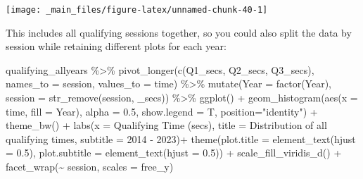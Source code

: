 \documentclass[
]{book}
\newenvironment{Shaded}{\begin{snugshade}}{\end{snugshade}}
\newcommand{\AttributeTok}[1]{\textcolor[rgb]{0.77,0.63,0.00}{#1}}
\newcommand{\FloatTok}[1]{\textcolor[rgb]{0.00,0.00,0.81}{#1}}
\newcommand{\FunctionTok}[1]{\textcolor[rgb]{0.00,0.00,0.00}{#1}}
\newcommand{\NormalTok}[1]{#1}
\newcommand{\SpecialCharTok}[1]{\textcolor[rgb]{0.00,0.00,0.00}{#1}}
\newcommand{\StringTok}[1]{\textcolor[rgb]{0.31,0.60,0.02}{#1}}
\begin{document}
\begin{center}\texttt{[image: \_main\_files/figure-latex/unnamed-chunk-40-1]} \end{center}

This includes all qualifying sessions together, so you could also split the data by session while retaining different plots for each year:

\begin{Shaded}
\begin{Highlighting}[]
\NormalTok{qualifying\_allyears }\SpecialCharTok{\%\textgreater{}\%}
  \FunctionTok{pivot\_longer}\NormalTok{(}\FunctionTok{c}\NormalTok{(}\StringTok{\textquotesingle{}Q1\_secs\textquotesingle{}}\NormalTok{, }\StringTok{\textquotesingle{}Q2\_secs\textquotesingle{}}\NormalTok{, }\StringTok{\textquotesingle{}Q3\_secs\textquotesingle{}}\NormalTok{),}
               \AttributeTok{names\_to =} \StringTok{\textquotesingle{}session\textquotesingle{}}\NormalTok{,}
               \AttributeTok{values\_to =} \StringTok{\textquotesingle{}time\textquotesingle{}}\NormalTok{) }\SpecialCharTok{\%\textgreater{}\%}
  \FunctionTok{mutate}\NormalTok{(}\AttributeTok{Year =} \FunctionTok{factor}\NormalTok{(Year),}
         \AttributeTok{session =} \FunctionTok{str\_remove}\NormalTok{(session, }\StringTok{\textquotesingle{}\_secs\textquotesingle{}}\NormalTok{)) }\SpecialCharTok{\%\textgreater{}\%}
  \FunctionTok{ggplot}\NormalTok{() }\SpecialCharTok{+}
  \FunctionTok{geom\_histogram}\NormalTok{(}\FunctionTok{aes}\NormalTok{(}\AttributeTok{x =}\NormalTok{ time, }\AttributeTok{fill =}\NormalTok{ Year),}
                 \AttributeTok{alpha =} \FloatTok{0.5}\NormalTok{, }\AttributeTok{show.legend =}\NormalTok{ T,}
                 \AttributeTok{position=}\StringTok{"identity"}\NormalTok{) }\SpecialCharTok{+}
  \FunctionTok{theme\_bw}\NormalTok{() }\SpecialCharTok{+}
  \FunctionTok{labs}\NormalTok{(}\AttributeTok{x =} \StringTok{\textquotesingle{}Qualifying Time (secs)\textquotesingle{}}\NormalTok{,}
       \AttributeTok{title =} \StringTok{\textquotesingle{}Distribution of all qualifying times\textquotesingle{}}\NormalTok{,}
       \AttributeTok{subtitle =} \StringTok{\textquotesingle{}2014 {-} 2023\textquotesingle{}}\NormalTok{)}\SpecialCharTok{+}
  \FunctionTok{theme}\NormalTok{(}\AttributeTok{plot.title =} \FunctionTok{element\_text}\NormalTok{(}\AttributeTok{hjust =} \FloatTok{0.5}\NormalTok{),}
        \AttributeTok{plot.subtitle =} \FunctionTok{element\_text}\NormalTok{(}\AttributeTok{hjust =} \FloatTok{0.5}\NormalTok{)) }\SpecialCharTok{+}
  \FunctionTok{scale\_fill\_viridis\_d}\NormalTok{() }\SpecialCharTok{+}
  \FunctionTok{facet\_wrap}\NormalTok{(}\SpecialCharTok{\textasciitilde{}}\NormalTok{ session, }\AttributeTok{scales =} \StringTok{\textquotesingle{}free\_y\textquotesingle{}}\NormalTok{)}
\end{Highlighting}
\end{Shaded}
\end{document}
